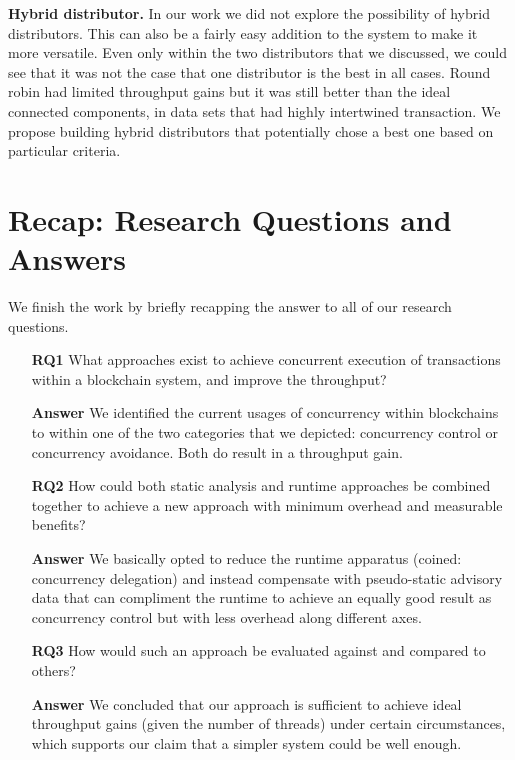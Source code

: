 \textbf{Hybrid distributor.} In our work we did not explore the possibility of hybrid distributors.
This can also be a fairly easy addition to the system to make it more versatile. Even only within
the two distributors that we discussed, we could see that it was not the case that one distributor
is the best in all cases. Round robin had limited throughput gains but it was still better than the
ideal connected components, in data sets that had highly intertwined transaction. We propose
building hybrid distributors that potentially chose a best one based on particular criteria.

\section{Recap: Research Questions and Answers}

We finish the work by briefly recapping the answer to all of our research questions.

\begin{enumerate}
	\item [\textbf{RQ1}] What approaches exist to achieve concurrent execution of transactions within a
	blockchain system, and improve the throughput?

	\item [\textbf{Answer}] We identified the current usages of concurrency within blockchains to within
	one of the two categories that we depicted: concurrency control or concurrency avoidance. Both
	do result in a throughput gain.

	\item [\textbf{RQ2}] How could both static analysis and runtime approaches be combined together to
	achieve a new approach with minimum overhead and measurable benefits?

	\item [\textbf{Answer}] We basically opted to reduce the runtime apparatus (coined: concurrency
	delegation) and instead compensate with pseudo-static advisory data that can compliment the
	runtime to achieve an equally good result as concurrency control but with less overhead along
	different axes.
	\item [\textbf{RQ3}] How would such an approach be evaluated against and compared to others?

	\item [\textbf{Answer}] We concluded that our approach is sufficient to achieve ideal throughput
	gains (given the number of threads) under certain circumstances, which supports our claim that a
	simpler system could be well enough.
\end{enumerate}
